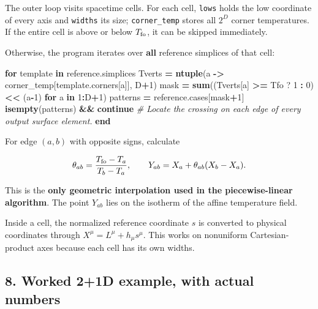 \documentclass[
  10pt,
]{article}
\newenvironment{Shaded}{\begin{snugshade}}{\end{snugshade}}
\newcommand{\CommentTok}[1]{\textcolor[rgb]{0.56,0.35,0.01}{\textit{#1}}}
\newcommand{\ControlFlowTok}[1]{\textcolor[rgb]{0.13,0.29,0.53}{\textbf{#1}}}
\newcommand{\FloatTok}[1]{\textcolor[rgb]{0.00,0.00,0.81}{#1}}
\newcommand{\FunctionTok}[1]{\textcolor[rgb]{0.13,0.29,0.53}{\textbf{#1}}}
\newcommand{\KeywordTok}[1]{\textcolor[rgb]{0.13,0.29,0.53}{\textbf{#1}}}
\newcommand{\NormalTok}[1]{#1}
\newcommand{\OperatorTok}[1]{\textcolor[rgb]{0.81,0.36,0.00}{\textbf{#1}}}
\begin{document}
The outer loop visits spacetime cells. For each cell, \texttt{lows}
holds the low coordinate of every axis and \texttt{widths} its size;
\texttt{corner\_temp} stores all \(2^D\) corner temperatures. If the
entire cell is above or below \(T_{\rm fo}\), it can be skipped
immediately.

Otherwise, the program iterates over \textbf{all} reference simplices of
that cell:

\begin{Shaded}
\begin{Highlighting}[]
\ControlFlowTok{for}\NormalTok{ template }\KeywordTok{in}\NormalTok{ reference.simplices}
\NormalTok{    Tverts }\OperatorTok{=} \FunctionTok{ntuple}\NormalTok{(a }\OperatorTok{{-}\textgreater{}}\NormalTok{ corner\_temp[template.corners[a]], D}\OperatorTok{+}\FloatTok{1}\NormalTok{)}
\NormalTok{    mask }\OperatorTok{=} \FunctionTok{sum}\NormalTok{((Tverts[a] }\OperatorTok{\textgreater{}=}\NormalTok{ Tfo ? }\FloatTok{1} \OperatorTok{:} \FloatTok{0}\NormalTok{) }\OperatorTok{\textless{}\textless{}}\NormalTok{ (a}\OperatorTok{{-}}\FloatTok{1}\NormalTok{) }\ControlFlowTok{for}\NormalTok{ a }\KeywordTok{in} \FloatTok{1}\OperatorTok{:}\NormalTok{D}\OperatorTok{+}\FloatTok{1}\NormalTok{)}
\NormalTok{    patterns }\OperatorTok{=}\NormalTok{ reference.cases[mask}\OperatorTok{+}\FloatTok{1}\NormalTok{]}
    \FunctionTok{isempty}\NormalTok{(patterns) }\OperatorTok{\&\&} \ControlFlowTok{continue}
    \CommentTok{\# Locate the crossing on each edge of every output surface element.}
\ControlFlowTok{end}
\end{Highlighting}
\end{Shaded}

For edge \((a,b)\) with opposite signs, calculate

\[
\theta_{ab}=\frac{T_{\rm fo}-T_a}{T_b-T_a},\qquad
Y_{ab}=X_a+\theta_{ab}(X_b-X_a).
\]

This is the \textbf{only geometric interpolation used in the
piecewise-linear algorithm}. The point \(Y_{ab}\) lies on the isotherm
of the affine temperature field.

Inside a cell, the normalized reference coordinate \(s\) is converted to
physical coordinates through \(X^\mu=L^\mu+h_\mu s^\mu\). This works on
nonuniform Cartesian-product axes because each cell has its own widths.

\subsection{8. Worked 2+1D example, with actual
numbers}\label{worked-21d-example-with-actual-numbers}
\end{document}
